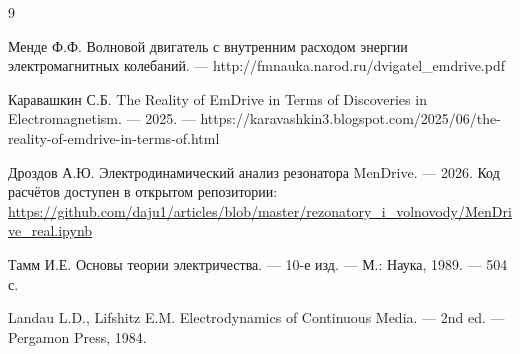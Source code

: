 \documentclass[a4paper,12pt]{article}
\begin{document}
\begin{thebibliography}{9}

Менде Ф.Ф. Волновой двигатель с внутренним расходом энергии электромагнитных
колебаний. --- http://fmnauka.narod.ru/dvigatel\_emdrive.pdf

Каравашкин С.Б. The Reality of EmDrive in Terms of Discoveries in
Electromagnetism. --- 2025. ---
https://karavashkin3.blogspot.com/2025/06/the-reality-of-emdrive-in-terms-of.html

Дроздов А.Ю. Электродинамический анализ резонатора MenDrive. --- 2026.
Код расчётов доступен в открытом репозитории: \\
\url{https://github.com/daju1/articles/blob/master/rezonatory\_i\_volnovody/MenDrive\_real.ipynb}

Тамм И.Е. Основы теории электричества. --- 10-е изд. --- М.: Наука, 1989. --- 504 с.

Landau L.D., Lifshitz E.M. Electrodynamics of Continuous Media. --- 2nd ed. ---
Pergamon Press, 1984.

\end{thebibliography}







\end{document}
